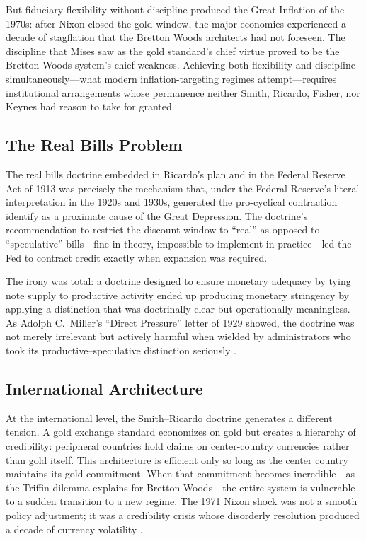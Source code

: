 \documentclass[12pt]{article}
\begin{document}
But fiduciary flexibility without discipline produced the Great
Inflation of the 1970s: after Nixon closed the gold window, the
major economies experienced a decade of stagflation that the
Bretton Woods architects had not foreseen.  The discipline that
Mises saw as the gold standard's chief virtue proved to be the
Bretton Woods system's chief weakness.  Achieving both flexibility
and discipline simultaneously---what modern inflation-targeting
regimes attempt---requires institutional arrangements whose
permanence neither Smith, Ricardo, Fisher, nor Keynes had reason
to take for granted.

\subsection{The Real Bills Problem}

The real bills doctrine embedded in Ricardo's plan and in the
Federal Reserve Act of 1913 was precisely the mechanism that,
under the Federal Reserve's literal interpretation in the 1920s
and 1930s, generated the pro-cyclical contraction
\citet{HumphreyTimberlake2019} identify as a proximate cause of
the Great Depression.  The doctrine's recommendation to restrict
the discount window to ``real'' as opposed to ``speculative''
bills---fine in theory, impossible to implement in practice---led the
Fed to contract credit exactly when expansion was required.

The irony was total: a doctrine designed to ensure monetary
adequacy by tying note supply to productive activity ended up
producing monetary stringency by applying a distinction that was
doctrinally clear but operationally meaningless.  As Adolph
C.\ Miller's ``Direct Pressure'' letter of 1929 showed, the doctrine
was not merely irrelevant but actively harmful when wielded
by administrators who took its productive--speculative distinction
seriously \citep{HumphreyTimberlake2019}.

\subsection{International Architecture}

At the international level, the Smith--Ricardo doctrine generates
a different tension.  A gold exchange standard economizes on gold
but creates a hierarchy of credibility: peripheral countries hold
claims on center-country currencies rather than gold itself.  This
architecture is efficient only so long as the center country
maintains its gold commitment.  When that commitment becomes
incredible---as the Triffin dilemma explains for Bretton
Woods---the entire system is vulnerable to a sudden transition to
a new regime.  The 1971 Nixon shock was not a smooth policy
adjustment; it was a credibility crisis whose disorderly resolution
produced a decade of currency volatility \citep{Volcker1992}.
\end{document}
